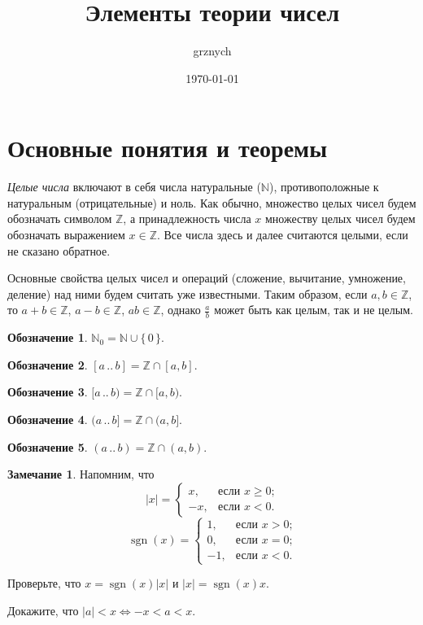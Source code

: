 \documentclass[14pt, a4paper]{extarticle}
\title{Элементы теории чисел}
\author{grznych}
\date{\today}
\theoremstyle{definition}
\newtheorem*{remark}{Замечание}
\newtheorem*{desig}{Обозначение}
\DeclareMathOperator{\sgn}{sgn}
\begin{document}
	
\maketitle
\tableofcontents
	
\newpage
\section{Основные понятия и теоремы}
\label{section:osn}
	
	\emph{Целые числа} включают в себя числа натуральные ($\mathbb{N}$), противоположные к натуральным (отрицательные) и ноль. Как обычно, множество целых чисел будем обозначать символом $\mathbb{Z}$, а принадлежность числа $x$ множеству целых чисел будем обозначать выражением $x\in\mathbb{Z}$. Все числа здесь и далее считаются целыми, если не сказано обратное.
	
	Основные свойства целых чисел и операций (сложение, вычитание, умножение, деление) над ними будем считать уже известными. Таким образом, если $a,b\in\mathbb{Z}$, то $a+b\in\mathbb{Z}$, $a-b\in\mathbb{Z}$, $ab\in\mathbb{Z}$, однако $\frac{a}{b}$ может быть как целым, так и не целым.

	\begin{desig}
		$\mathbb{N}_0=\mathbb{N}\cup\{\,0\,\}$.
	\end{desig}
	
	\begin{desig}
		$[a\,..\,b]=\mathbb{Z}\cap[a,b]$.
	\end{desig}
	
	\begin{desig}
		$[a\,..\,b)=\mathbb{Z}\cap[a,b)$.
	\end{desig}
	
	\begin{desig}
		$(a\,..\,b]=\mathbb{Z}\cap(a,b]$.
	\end{desig}
	
	\begin{desig}
		$(a\,..\,b)=\mathbb{Z}\cap(a,b)$.
	\end{desig}

	\begin{remark}
		Напомним, что $$|x|=
		\begin{cases}
			x,&\text{если $x\geqslant0$;}\\
			-x,&\text{если $x<0$.}
		\end{cases}$$
		$$\sgn(x)=
		\begin{cases}
			1,&\text{если $x>0$;}\\
			0,&\text{если $x=0$;}\\
			-1,&\text{если $x<0$.}
		\end{cases}$$

		Проверьте, что $x=\sgn(x)|x|$ и $|x|=\sgn(x)x$.
		
		Докажите, что $|a|<x\Leftrightarrow-x<a<x$.
	\end{remark}
\end{document}
